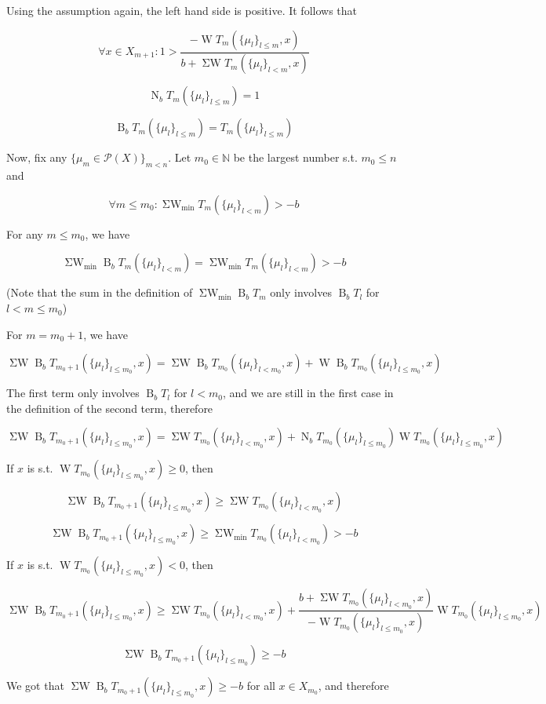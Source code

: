 \documentclass[a4paper]{article}
\newcommand{\Nats}{\mathbb{N}}
\newcommand{\Prob}{\mathcal{P}}
\newcommand{\B}{\operatorname{B}_b}
\newcommand{\N}{\operatorname{N}_b}
\newcommand{\W}{\operatorname{W}}
\newcommand{\SW}{\operatorname{\Sigma W}}
\newcommand{\SWm}{\operatorname{\Sigma W}_{\min}}
\begin{document}
Using the assumption again, the left hand side is positive. It follows that

$$\forall x \in X_{m+1}: 1 > \frac{-\W T_{m}(\{\mu_l\}_{l \leq m}, x)}{b + \SW T_{m}(\{\mu_l\}_{l < m}, x)}$$

$$\N T_m(\{\mu_l\}_{l \leq m}) = 1$$

$$\B T_m(\{\mu_l\}_{l \leq m}) = T_m(\{\mu_l\}_{l \leq m})$$

Now, fix any ${\{\mu_m \in \Prob(X)\}_{m<n}}$. Let ${m_0 \in \Nats}$ be the largest number s.t. ${m_0 \leq n}$ and 

$$\forall m \leq m_0: \SWm T_m(\{\mu_l\}_{l<m}) > -b$$

For any ${m \leq m_0}$, we have

$$\SWm \B T_m(\{\mu_l \}_{l<m})=\SWm T_m(\{\mu_l \}_{l<m}) > -b$$

(Note that the sum in the definition of ${\SWm \B T_m}$ only involves ${\B T_l}$ for ${l < m \leq m_0}$)

For ${m=m_0+1}$, we have

$$\SW \B T_{m_0+1}(\{\mu_l \}_{l \leq m_0},x) = \SW \B T_{m_0}(\{\mu_l \}_{l < m_0},x) + \W \B T_{m_0}(\{\mu_l \}_{l \leq m_0},x)$$

The first term only involves ${\B T_l}$ for ${l < m_0}$, and we are still in the first case in the definition of the second term, therefore

$$\SW \B T_{m_0+1}(\{\mu_l \}_{l \leq m_0},x) = \SW T_{m_0}(\{\mu_l \}_{l < m_0},x) + \N T_{m_0}(\{\mu_l \}_{l \leq m_0}) \W T_{m_0}(\{\mu_l \}_{l \leq m_0},x)$$

If ${x}$ is s.t. ${\W T_{m_0}(\{\mu_l \}_{l \leq m_0},x) \geq 0}$, then

$$\SW \B T_{m_0+1}(\{\mu_l \}_{l \leq m_0},x) \geq \SW T_{m_0}(\{\mu_l \}_{l < m_0},x)$$

$$\SW \B T_{m_0+1}(\{\mu_l \}_{l \leq m_0},x) \geq \SWm T_{m_0}(\{\mu_l \}_{l < m_0}) > -b$$

If ${x}$ is s.t. ${\W T_{m_0}(\{\mu_l \}_{l \leq m_0},x) < 0}$, then

$$\SW \B T_{m_0+1}(\{\mu_l \}_{l \leq m_0},x) \geq \SW T_{m_0}(\{\mu_l \}_{l < m_0},x) + \frac{b + \SW T_{m_0}(\{\mu_l\}_{l < {m_0}},x)}{-\W T_{m_0}(\{\mu_l\}_{l \leq {m_0}}, x)} \W T_{m_0}(\{\mu_l \}_{l \leq m_0},x)$$

$$\SW \B T_{m_0+1}(\{\mu_l \}_{l \leq m_0}) \geq -b$$

We got that $\SW \B T_{m_0+1}(\{\mu_l \}_{l \leq m_0},x) \geq -b$ for all ${x \in X_{m_0}}$, and therefore
\end{document}
